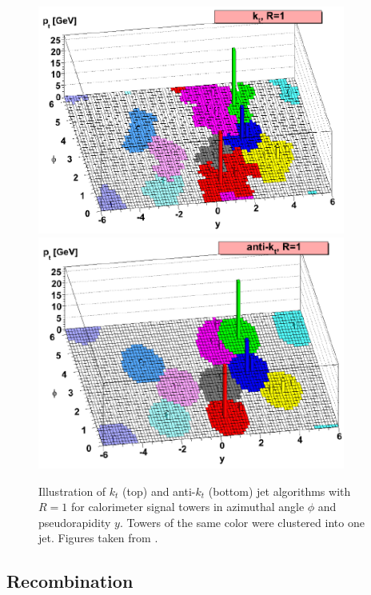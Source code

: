 \begin{figure}[p]
  \centering
  \includegraphics[width=0.9\textwidth]{Chapter2/JetRecombination1.png}
  \includegraphics[width=0.9\textwidth]{Chapter2/JetRecombination2.png}
  \caption[Illustration of $k_t$ (top) and anti-$k_t$ (bottom) jet algorithms with $R=1$ for
          calorimeter signal towers in azimuthal angle $\phi$ and pseudorapidity $y$. Towers of
          the same color were clustered into one jet. ]
          {Illustration of $k_t$ (top) and anti-$k_t$ (bottom) jet algorithms with $R=1$ for
          calorimeter signal towers in azimuthal angle $\phi$ and pseudorapidity $y$. Towers of
          the same color were clustered into one jet. Figures taken from
          \cite{JetTheoreticalPictures}.} 
  \label{fig:JetRecombination}
\end{figure}

\subsection{Recombination}
\label{sse:Recombination}

